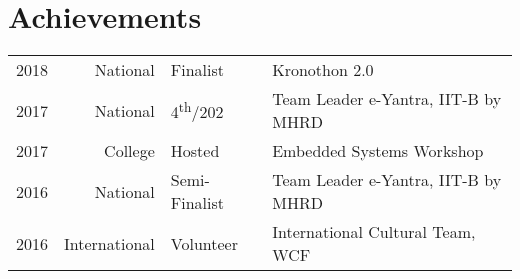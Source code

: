 \documentclass[]{deedy-resume-openfont}
\begin{document}
\begin{minipage}[t]{0.66\textwidth}
\sectionsep


\section{Achievements} 
\begin{tabular}{rrll}
2018 & National & Finalist & Kronothon 2.0 \\
2017 & National & 4\textsuperscript{th}/202  & Team Leader e-Yantra, IIT-B by MHRD \\
2017 & College & Hosted & Embedded Systems Workshop \\
2016 & National & Semi-Finalist & Team Leader e-Yantra, IIT-B by MHRD \\
2016 & International & Volunteer & International Cultural Team, WCF \\
\end{tabular}
\sectionsep

\end{minipage} 
\end{document}
